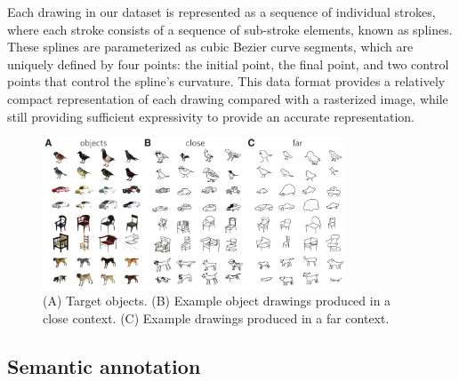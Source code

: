 \documentclass[10pt,letterpaper]{article}
\begin{document}
Each drawing in our dataset is represented as a sequence of individual strokes, where each stroke consists of a sequence of sub-stroke elements, known as splines. 
These splines are parameterized as cubic Bezier curve segments, which are uniquely defined by four points: the initial point, the final point, and two control points that control the spline's curvature.
This data format provides a relatively compact representation of each drawing compared with a rasterized image, while still providing sufficient expressivity to provide an accurate representation. 


\begin{figure}
\centering
\includegraphics[width=0.8\textwidth]{figures/refgame_gallery.pdf}
\caption{(A) Target objects. (B) Example object drawings produced in a close context. (C) Example drawings produced in a far context.}
\label{refgame_gallery}
\end{figure}

\subsection{Semantic annotation}
\end{document}
